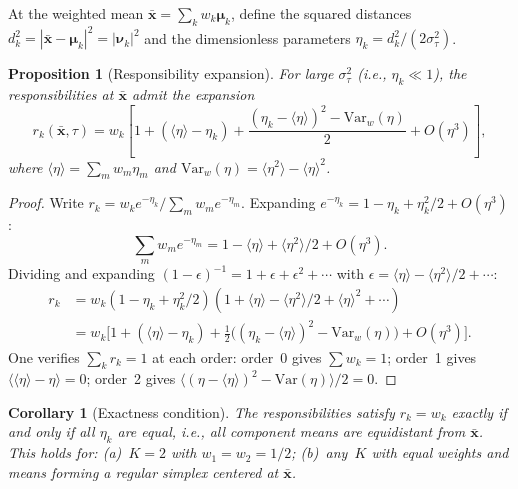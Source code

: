 \documentclass[11pt]{article}
\newtheorem{proposition}[theorem]{Proposition}
\newtheorem{corollary}[theorem]{Corollary}
\newcommand{\Var}{\mathrm{Var}}
\begin{document}
At the weighted mean $\bar{\bm{x}} = \sum_k w_k \bm{\mu}_k$, define the squared distances $d_k^2 = |\bar{\bm{x}} - \bm{\mu}_k|^2 = |\bm{\nu}_k|^2$ and the dimensionless parameters $\eta_k = d_k^2/(2\sigma_\tau^2)$.

\begin{proposition}[Responsibility expansion]\label{prop:rk-expansion}
For large $\sigma_\tau^2$ (i.e., $\eta_k \ll 1$), the responsibilities at $\bar{\bm{x}}$ admit the expansion
\begin{equation}\label{eq:rk-expansion}
  r_k(\bar{\bm{x}},\tau)
  = w_k\!\left[1 + (\langle\eta\rangle - \eta_k) + \frac{(\eta_k - \langle\eta\rangle)^2 - \Var_w(\eta)}{2} + O(\eta^3)\right],
\end{equation}
where $\langle\eta\rangle = \sum_m w_m \eta_m$ and $\Var_w(\eta) = \langle\eta^2\rangle - \langle\eta\rangle^2$.
\end{proposition}

\begin{proof}
Write $r_k = w_k e^{-\eta_k}/\sum_m w_m e^{-\eta_m}$.
Expanding $e^{-\eta_k} = 1 - \eta_k + \eta_k^2/2 + O(\eta^3)$:
\[
  \sum_m w_m e^{-\eta_m} = 1 - \langle\eta\rangle + \langle\eta^2\rangle/2 + O(\eta^3).
\]
Dividing and expanding $(1-\epsilon)^{-1} = 1 + \epsilon + \epsilon^2 + \cdots$ with $\epsilon = \langle\eta\rangle - \langle\eta^2\rangle/2 + \cdots$:
\begin{align*}
  r_k &= w_k(1 - \eta_k + \eta_k^2/2)(1 + \langle\eta\rangle - \langle\eta^2\rangle/2 + \langle\eta\rangle^2 + \cdots)\\
      &= w_k\bigl[1 + (\langle\eta\rangle - \eta_k) + \tfrac{1}{2}\bigl((\eta_k - \langle\eta\rangle)^2 - \Var_w(\eta)\bigr) + O(\eta^3)\bigr].
\end{align*}
One verifies $\sum_k r_k = 1$ at each order: order~0 gives $\sum w_k = 1$; order~1 gives $\langle\langle\eta\rangle - \eta\rangle = 0$; order~2 gives $\langle(\eta - \langle\eta\rangle)^2 - \Var(\eta)\rangle/2 = 0$.
\end{proof}

\begin{corollary}[Exactness condition]\label{cor:exactness}
The responsibilities satisfy $r_k = w_k$ exactly if and only if all $\eta_k$ are equal, i.e., all component means are equidistant from $\bar{\bm{x}}$.
This holds for: (a)~$K = 2$ with $w_1 = w_2 = 1/2$; (b)~any~$K$ with equal weights and means forming a regular simplex centered at $\bar{\bm{x}}$.
\end{corollary}
\end{document}
